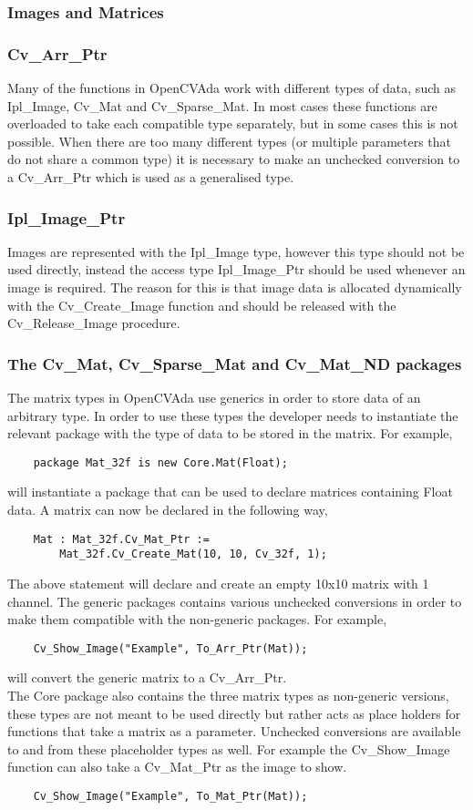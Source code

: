 \subsubsection{Images and Matrices}
\subsubsection*{Cv_Arr_Ptr}
Many of the functions in OpenCVAda work with different types of data, such as Ipl_Image, Cv_Mat and Cv_Sparse_Mat. In most cases these functions are overloaded to take each compatible type separately, but in some cases this is not possible.
When there are too many different types (or multiple parameters that do not share a common type) it is necessary to make an unchecked conversion to a Cv_Arr_Ptr which is used as a generalised type.
\subsubsection*{Ipl_Image_Ptr}
Images are represented with the Ipl_Image type, however this type should not be used directly, instead the access type Ipl_Image_Ptr should be used whenever an image is required. The reason for this is that image data is allocated dynamically with the Cv_Create_Image function and should be released with the Cv_Release_Image procedure. 
\subsubsection*{The Cv_Mat, Cv_Sparse_Mat and Cv_Mat_ND packages}
The matrix types in OpenCVAda use generics in order to store data of an arbitrary type. In order to use these types the developer needs to instantiate the relevant package with the type of data to be stored in the matrix. For example,
\begin{lstlisting}
	package Mat_32f is new Core.Mat(Float);
\end{lstlisting}
will instantiate a package that can be used to declare matrices containing Float data. A matrix can now be declared in the following way,
\begin{lstlisting}
	Mat : Mat_32f.Cv_Mat_Ptr := 
		Mat_32f.Cv_Create_Mat(10, 10, Cv_32f, 1);
\end{lstlisting}
The above statement will declare and create an empty 10x10 matrix with 1 channel.
The generic packages contains various unchecked conversions in order to make them compatible with the non-generic packages. For example,
\begin{lstlisting}
	Cv_Show_Image("Example", To_Arr_Ptr(Mat));
\end{lstlisting}
will convert the generic matrix to a Cv_Arr_Ptr.
\\
The Core package also contains the three matrix types as non-generic versions, these types are not meant to be used directly but rather acts as place holders for functions that take a matrix as a parameter. Unchecked conversions are available to and from these placeholder types as well. For example the Cv_Show_Image function can also take a Cv_Mat_Ptr as the image to show.
\begin{lstlisting}
	Cv_Show_Image("Example", To_Mat_Ptr(Mat));
\end{lstlisting}
